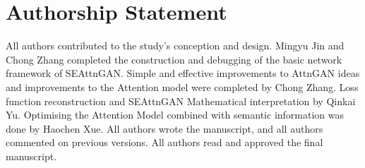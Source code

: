 \documentclass[runningheads, orivec]{llncs}
\begin{document}
\section{Authorship Statement}
\vspace{-8pt}
All authors contributed to the study's conception and design. Mingyu Jin and Chong Zhang completed the construction and debugging of the basic network framework of SEAttnGAN. Simple and effective improvements to AttnGAN ideas and improvements to the Attention model were completed by Chong Zhang. Loss function reconstruction and SEAttnGAN Mathematical interpretation by Qinkai Yu. Optimising the Attention Model combined with semantic information was done by Haochen Xue. All authors wrote the manuscript, and all authors commented on previous versions.  All authors read and approved the final manuscript.

\vspace{50pt}


\end{document}
